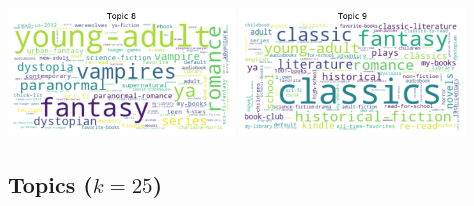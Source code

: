 \documentclass[handout]{beamer}
\begin{document}
\begin{frame}
\centering
    \vfill
      \includegraphics[width=0.45\textwidth]{../image/goodreads-topics-profiles-recommendations/tag-cloud-10-8.png} \hfill
    \includegraphics[width=0.45\textwidth]{../image/goodreads-topics-profiles-recommendations/tag-cloud-10-9.png}
    \vfill

\end{frame}



\subsection{Topics ($k=25$)}
\end{document}
